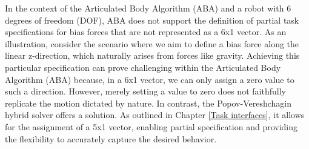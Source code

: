 \documentclass[report.tex]{subfiles}
\begin{document}
    In the context of the Articulated Body Algorithm (ABA) and a robot with 6 degrees of freedom (DOF), ABA does not support the definition of partial task specifications for bias forces that are not represented as a 6x1 vector. As an illustration, consider the scenario where we aim to define a bias force along the linear z-direction, which naturally arises from forces like gravity. Achieving this particular specification can prove challenging within the Articulated Body Algorithm (ABA) because, in a 6x1 vector, we can only assign a zero value to such a direction. However, merely setting a value to zero does not faithfully replicate the motion dictated by nature.
    In contrast, the Popov-Vereshchagin hybrid solver offers a solution. As outlined in Chapter \ref{Task interfaces}, it allows for the assignment of a 5x1 vector, enabling partial specification and providing the flexibility to accurately capture the desired behavior.
\end{document}
